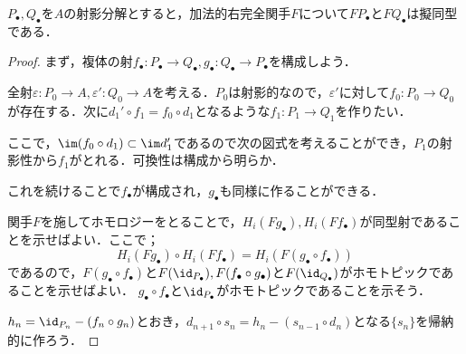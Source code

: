 \begin{prop}\label{prop:左導来関手のwell-definedness}
	$P_\bullet,Q_\bullet$を$A$の射影分解とすると，加法的右完全関手$F$について$F P_\bullet$と$F Q_\bullet$は擬同型である．
\end{prop}
\begin{proof}
	
まず，複体の射$f_\bullet:P_\bullet\to Q_\bullet,g_\bullet:Q_\bullet\to P_\bullet$を構成しよう．
	
全射$\varepsilon:P_0\to A,\varepsilon':Q_0\to A$を考える．$P_0$は射影的なので，$\varepsilon'$に対して$f_0:P_0\to Q_0$が存在する．次に$d_1'\circ f_1=f_0\circ d_1$となるような$f_1:P_1\to Q_1$を作りたい．
	
\begin{figure}[H]
	\centering
	\caption{}
\end{figure}
	
ここで，$\im(f_0\circ d_1)\subset\im d_1'$であるので次の図式を考えることができ，$P_1$の射影性から$f_1$がとれる．可換性は構成から明らか．

\begin{figure}[H]
	\centering
	\caption{}
\end{figure}	
	
これを続けることで$f_\bullet$が構成され，$g_\bullet$も同様に作ることができる．

関手$F$を施してホモロジーをとることで，$H_i(Fg_\bullet),H_i(Ff_\bullet)$が同型射であることを示せばよい．ここで；
\[H_i(Fg_\bullet)\circ H_i(Ff_\bullet)=H_i(F(g_\bullet\circ f_\bullet))\]
であるので，$F(g_\bullet\circ f_\bullet)$と$F(\id_{P_\bullet}),F(f_\bullet\circ g_\bullet)$と$F(\id_{Q_\bullet})$がホモトピックであることを示せばよい． $g_\bullet\circ f_\bullet$と$\id_{P_\bullet}$がホモトピックであることを示そう．

$h_n=\id_{P_n}-(f_n\circ g_n)$とおき，$d_{n+1}\circ s_n=h_n-(s_{n-1}\circ d_n)$となる$\{s_n\}$を帰納的に作ろう．


\end{proof}
